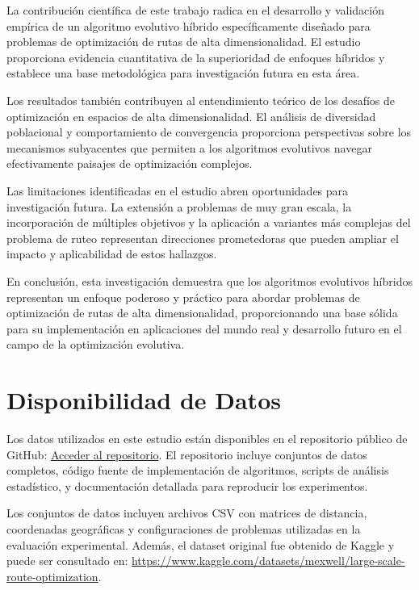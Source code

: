 \documentclass[10pt,a4paper]{article}
\begin{document}
\begin{multicols}{2}
La contribución científica de este trabajo radica en el desarrollo y validación empírica de un algoritmo evolutivo híbrido específicamente diseñado para problemas de optimización de rutas de alta dimensionalidad. El estudio proporciona evidencia cuantitativa de la superioridad de enfoques híbridos y establece una base metodológica para investigación futura en esta área.

Los resultados también contribuyen al entendimiento teórico de los desafíos de optimización en espacios de alta dimensionalidad. El análisis de diversidad poblacional y comportamiento de convergencia proporciona perspectivas sobre los mecanismos subyacentes que permiten a los algoritmos evolutivos navegar efectivamente paisajes de optimización complejos.

Las limitaciones identificadas en el estudio abren oportunidades para investigación futura. La extensión a problemas de muy gran escala, la incorporación de múltiples objetivos y la aplicación a variantes más complejas del problema de ruteo representan direcciones prometedoras que pueden ampliar el impacto y aplicabilidad de estos hallazgos.

En conclusión, esta investigación demuestra que los algoritmos evolutivos híbridos representan un enfoque poderoso y práctico para abordar problemas de optimización de rutas de alta dimensionalidad, proporcionando una base sólida para su implementación en aplicaciones del mundo real y desarrollo futuro en el campo de la optimización evolutiva.



\section{Disponibilidad de Datos}

Los datos utilizados en este estudio están disponibles en el repositorio público de GitHub: \href{https://github.com/YonhelMamaniCruz/M_optimizacion/tree/main/actividad3_unidad2}{Acceder al repositorio}. El repositorio incluye conjuntos de datos completos, código fuente de implementación de algoritmos, scripts de análisis estadístico, y documentación detallada para reproducir los experimentos.

Los conjuntos de datos incluyen archivos CSV con matrices de distancia, coordenadas geográficas y configuraciones de problemas utilizadas en la evaluación experimental. Además, el dataset original fue obtenido de Kaggle y puede ser consultado en: \href{https://www.kaggle.com/datasets/mexwell/large-scale-route-optimization}{https://www.kaggle.com/datasets/mexwell/large-scale-route-optimization}. 


\end{multicols}
\end{document}
